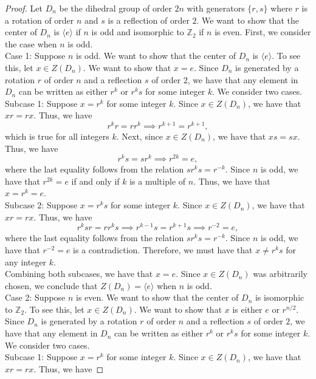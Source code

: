 \documentclass{article}
\def\zz{{\mathbb Z}}
\begin{document}
\begin{proof}
    Let $D_n$ be the dihedral group of order $2n$ with generators $\{r,s\}$ where $r$ is a rotation of order $n$ and $s$ is a reflection of order $2$. We want to show that the center of $D_n$ is $\langle e \rangle$ if $n$ is odd and isomorphic to $\zz_2$ if $n$ is even. First, we consider the case when $n$ is odd. \\
    Case 1: Suppose $n$ is odd. We want to show that the center of $D_n$ is $\langle e \rangle$. To see this, let $x \in Z(D_n)$. We want to show that $x = e$. Since $D_n$ is generated by a rotation $r$ of order $n$ and a reflection $s$ of order $2$, we have that any element in $D_n$ can be written as either $r^k$ or $r^ks$ for some integer $k$. We consider two cases. \\
    Subcase 1: Suppose $x = r^k$ for some integer $k$. Since $x \in Z(D_n)$, we have that $xr = rx$. Thus, we have
    \[
        r^k r = r r^k \implies r^{k+1} = r^{k+1},
    \]
    which is true for all integers $k$. Next, since $x \in Z(D_n)$, we have that $xs = sx$. Thus, we have
    \[
        r^k s = s r^k \implies r^{2k} = e,
    \]
    where the last equality follows from the relation $s r^k s = r^{-k}$. Since $n$ is odd, we have that $r^{2k} = e$ if and only if $k$ is a multiple of $n$. Thus, we have that $x = r^k = e$. \\
    Subcase 2: Suppose $x = r^k s$ for some integer $k$. Since $x \in Z(D_n)$, we have that $xr = rx$. Thus, we have
    \[
        r^k s r = r r^k s \implies r^{k-1} s = r^{k+1} s \implies r^{-2} = e,
    \]
    where the last equality follows from the relation $s r^k s = r^{-k}$. Since $n$ is odd, we have that $r^{-2} = e$ is a contradiction. Therefore, we must have that $x \neq r^k s$ for any integer $k$. \\
    Combining both subcases, we have that $x = e$. Since $x \in Z(D_n)$ was arbitrarily chosen, we conclude that $Z(D_n) = \langle e \rangle$ when $n$ is odd. \\
    Case 2: Suppose $n$ is even. We want to show that the center of $D_n$ is isomorphic to $\zz_2$. To see this, let $x \in Z(D_n)$. We want to show that $x$ is either $e$ or $r^{n/2}$. Since $D_n$ is generated by a rotation $r$ of order $n$ and a reflection $s$ of order $2$, we have that any element in $D_n$ can be written as either $r^k$ or $r^k s$ for some integer $k$. We consider two cases. \\
    Subcase 1: Suppose $x = r^k$ for some integer $k$. Since $x \in Z(D_n)$, we have that $xr = rx$. Thus, we have

\end{proof}
\end{document}
